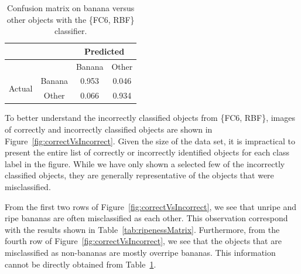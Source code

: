 \documentclass{article} %
\begin{document}
\begin{table}[h]
\centering
\caption{Confusion matrix on banana versus other objects with the \{FC6, RBF\} classifier. }
\label{tab:objectMatrix}
\begin{tabular}{|c|c|c|c|}\hline
&&\multicolumn{2}{c|}{Predicted}\\\hline
&&Banana&Other\\\hline
\multirow{2}{*}{Actual}&Banana&\cellcolor{SFUred!65}0.953&\cellcolor{SFUred!15}0.046\\\cline{2-4}
&Other&\cellcolor{SFUred!15}0.066&\cellcolor{SFUred!65}0.934\\\hline
\end{tabular}
\end{table}

To better understand the incorrectly classified objects from \{FC6, RBF\}, images of correctly and incorrectly classified objects are shown in Figure~\ref{fig:correctVsIncorrect}. Given the size of the data set, it is impractical to present the entire list of correctly or incorrectly identified objects for each class label in the figure. While we have only shown a selected few of the incorrectly classified objects, they are generally representative of the objects that were misclassified.

From the first two rows of Figure~\ref{fig:correctVsIncorrect}, we see that unripe and ripe bananas are often misclassified as each other. This observation correspond with the results shown in Table~\ref{tab:ripenessMatrix}. Furthermore, from the fourth row of Figure~\ref{fig:correctVsIncorrect}, we see that the objects that are misclassified as non-bananas are mostly overripe bananas. This information cannot be directly obtained from Table~\ref{tab:objectMatrix}.
\end{document}
